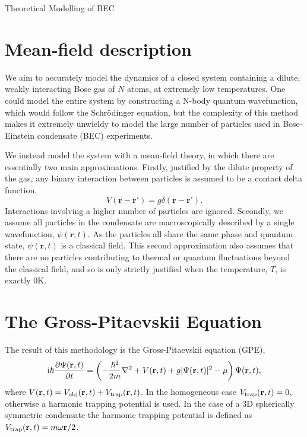 \begin{chapter}{\label{cha:theoretical_model}Theoretical Modelling of BEC}
\section{\label{section:meanfield} Mean-field description}
We aim to accurately model the dynamics of a closed system containing a dilute, weakly interacting Bose gas of $N$ atoms, at extremely low temperatures. One could model the entire system by constructing a N-body quantum wavefunction, which would follow the Schr\"odinger equation, but the complexity of this method makes it extremely unwieldy to model the large number of particles used in Bose-Einstein condensate (BEC) experiments.

We instead model the system with a mean-field theory, in which there are essentially two main approximations. Firstly, justified by the dilute property of the gas, any binary interaction between particles is assumed to be a contact delta function,
\begin{equation*}
V(\mathbf{r}-\mathbf{r}') = g \delta(\mathbf{r}-\mathbf{r}').
\end{equation*}
Interactions involving a higher number of particles are ignored. Secondly, we assume all particles in the condensate are macroscopically described by a single wavefunction, $\psi(\mathbf{r},t)$. As the particles all share the same phase and quantum state, $\psi(\mathbf{r},t)$ is a classical field. This second approximation also assumes that there are no particles contributing to thermal or quantum fluctuations beyond the classical field, and so is only strictly justified when the temperature, $T$, is exactly $0\mathrm{K}$.

\section{\label{section:gpe} The Gross-Pitaevskii Equation}
The result of this methodology is the Gross-Pitaevskii equation (GPE), 
\begin{equation}
\mathrm{i} \hbar \frac{\partial\Psi({\bf r},t)}{\partial t} = \left(-\frac{\hbar^2}{2m}\nabla^2 + V({\bf r},t) + g|\Psi({\bf r},t)|^2 - \mu \right) \Psi({\bf r},t),
\label{eq:gpe}
\end{equation}
where $V({\bf r},t) = V_{\mathrm{obj}}({\bf r},t) + V_{\mathrm{trap}}({\bf r},t)$. In the homogeneous case $V_{\mathrm{trap}}({\bf r},t)=0$, otherwise a harmonic trapping potential is used. In the case of a 3D spherically symmetric condensate the harmonic trapping potential is defined as $V_{\mathrm{trap}}({\bf r},t)=m\omega{\bf r}/2$.


\end{chapter}
